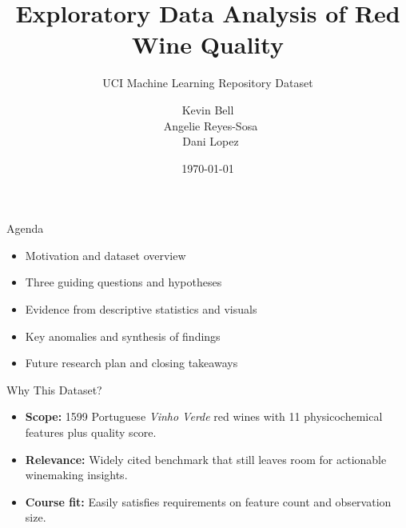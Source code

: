 \documentclass[aspectratio=169]{beamer}
\title{Exploratory Data Analysis of Red Wine Quality}
\subtitle{UCI Machine Learning Repository Dataset}
\author{Kevin Bell \\\ Angelie Reyes-Sosa \\\ Dani Lopez}
\date{\today}
\begin{document}
\begin{frame}
  \titlepage
\end{frame}

\begin{frame}{Agenda}
  \begin{itemize}
    \item Motivation and dataset overview
    \item Three guiding questions and hypotheses
    \item Evidence from descriptive statistics and visuals
    \item Key anomalies and synthesis of findings
    \item Future research plan and closing takeaways
  \end{itemize}
\end{frame}

\begin{frame}{Why This Dataset?}
  \begin{itemize}
    \item \textbf{Scope:} \num{1599} Portuguese \emph{Vinho Verde} red wines with \num{11} physicochemical features plus quality score.
    \item \textbf{Relevance:} Widely cited benchmark that still leaves room for actionable winemaking insights.
    \item \textbf{Course fit:} Easily satisfies requirements on feature count and observation size.
  \end{itemize}
\end{frame}
\end{document}
